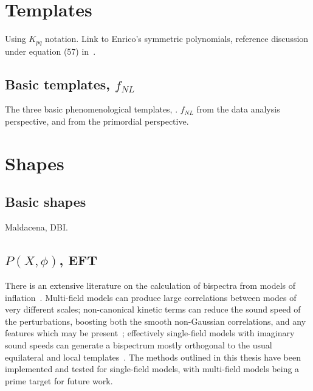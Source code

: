     \section{Templates}
    Using $K_{pq}$ notation.
    Link to Enrico's symmetric polynomials, reference discussion under
    equation (57) in~\cite{Fergusson_2010}.
    \subsection{Basic templates, $f_{NL}$}
    The three basic phenomenological templates, \planck.
    $f_{NL}$ from the data analysis perspective,
    and from the primordial perspective.
    \section{Shapes}
    \subsection{Basic shapes}
    Maldacena, DBI.
    \subsection{$P(X, \phi)$, EFT}
    There is an extensive literature on the calculation
of bispectra from models of inflation~\cite{chen_easther_lim_1,chen_easther_lim_2,chen_ng_0605,seery_ng_0503,px_burrage,adshead,flauger_pajer_resonant,features_bartolo,bdy_passaglia}.
Multi-field models can produce large
correlations between modes of very different scales;
non-canonical kinetic terms can reduce the sound speed of the perturbations,
boosting both the smooth non-Gaussian correlations, and any
features which may be present~\cite{dbi_adshead,dbi_in_the_sky,warp_features_dbi,dbi_silverstein,dbi_step_miranda,chen_folded_resonant,osc_avila};
effectively single-field models with imaginary sound speeds can generate a bispectrum
mostly orthogonal to the usual equilateral and local templates~\cite{RP_1}.
The methods outlined in this thesis have been implemented
and tested for single-field models,
with multi-field models being a prime target for future work.

